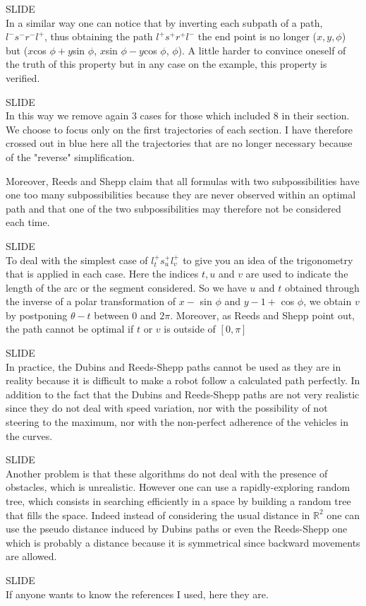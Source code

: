 \documentclass[12pt,a4paper]{article}
\newcommand{\slide}{\vspace{0.6cm}SLIDE\\}
\begin{document}
	\slide
	
	In a similar way one can notice that by inverting each subpath of a path, $l^-s^-r^-l^+$, thus obtaining the path $l^+s^+r^+l^-$ the end point is no longer ($x, y, \phi$) but ($x$cos $\phi+y$sin $\phi$, $x$sin $\phi-y$cos $\phi$, $\phi$). A little harder to convince oneself of the truth of this property but in any case on the example, this property is verified.
	
	\slide
	
	In this way we remove again 3 cases for those which included 8 in their section. We choose to focus only on the first trajectories of each section. I have therefore crossed out in blue here all the trajectories that are no longer necessary because of the "reverse" simplification.
	
	
	Moreover, Reeds and Shepp claim that all formulas with two subpossibilities have one too many subpossibilities because they are never observed within an optimal path and that one of the two subpossibilities may therefore not be considered each time.
	
	\slide
	
	To deal with the simplest case of $l_t^+s_u^+l_v^+$ to give you an idea of the trigonometry that is applied in each case. Here the indices $t, u$ and $v$ are used to indicate the length of the arc or the segment considered. So we have $u$ and $t$ obtained through the inverse of a polar transformation of $x -$ sin $\phi$ and $y - 1 +$ cos $\phi$, we obtain $v$ by postponing $\theta - t$ between 0 and $2\pi$. Moreover, as Reeds and Shepp point out, the path cannot be optimal if $t$ or $v$ is outside of $[0, \pi]$
	
	\slide
	
	In practice, the Dubins and Reeds-Shepp paths cannot be used as they are in reality because it is difficult to make a robot follow a calculated path perfectly. In addition to the fact that the Dubins and Reeds-Shepp paths are not very realistic since they do not deal with speed variation, nor with the possibility of not steering to the maximum, nor with the non-perfect adherence of the vehicles in the curves.
	
	\slide
	
	Another problem is that these algorithms do not deal with the presence of obstacles, which is unrealistic. However one can use a rapidly-exploring random tree, which consists in searching efficiently in a space by building a random tree that fills the space. Indeed instead of considering the usual distance in $\mathbb{R}^2$ one can use the pseudo distance induced by Dubins paths or even the Reeds-Shepp one which is probably a distance because it is symmetrical since backward movements are allowed.
	
	
	\slide
	
	If anyone wants to know the references I used, here they are.
\end{document}
